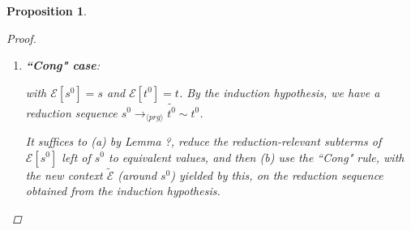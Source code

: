 \documentclass[11pt]{article} %
\newtheorem*{proposition*}{Proposition}
\begin{document}
\begin{framed}
\begin{proposition*}
\begin{proof}
\begin{enumerate}
\item \textbf{``Cong" case}:

\begin{prooftree}
\end{prooftree}

with $\mathcal{E}[s^0] = s$ and $\mathcal{E}[t^0] = t$. By the induction hypothesis, we have a reduction sequence $s^0 \longrightarrow_{\langle prg \rangle} \widetilde{t^0} \sim t^0$.

It suffices to (a) by Lemma ?, reduce the reduction-relevant subterms of $\mathcal{E}[s^0]$ left of $s^0$ to equivalent values, and then (b) use the ``Cong" rule, with the new context $\widetilde{\mathcal{E}}$ (around $s^0$) yielded by this, on the reduction sequence obtained from the induction hypothesis.

\end{enumerate}

\end{proof}

\end{proposition*}

\end{framed}
\end{document}
